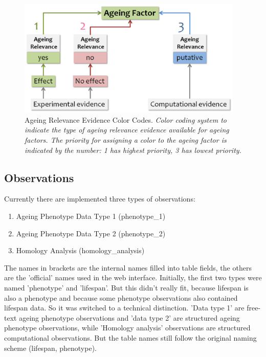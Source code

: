 \documentclass[12pt,a4paper,notitlepage,twoside]{report}
\begin{document}
 \begin{figure}[!ht]
      \includegraphics[width=0.96\textwidth]{data/ageing_relevance_evidence.png}
  \caption[Ageing Relevance Evidence Color Codes]{Ageing Relevance Evidence Color Codes. 
  \newline \textit{Color coding system to indicate the type of ageing relevance evidence available for ageing factors. The priority for assigning a color to the ageing factor is indicated by the number: 1 has highest priority, 3 has lowest priority.}
      \label{fig:ageing_relevance_evidence}
      }
\end{figure}


\subsection{Observations}
Currently there are implemented three types of observations:
\begin{enumerate}[label=\textbf{\arabic*.}]
\item Ageing Phenotype Data Type 1 (phenotype\_1)
\item Ageing Phenotype Data Type 2 (phenotype\_2)
\item Homology Analysis (homology\_analysis)
\end{enumerate}

The names in brackets are the internal names filled into table fields, the others are the 'official' names used in the web interface. Initially, the first two types were named 'phenotype' and 'lifespan'. But this didn't really fit, because lifespan is also a phenotype and because some phenotype observations also contained lifespan data. So it was switched to a technical distinction. 'Data type 1' are free-text ageing phenotype observations and 'data type 2' are structured ageing phenotype observations, while 'Homology analysis' observations are structured computational observations. But the table names still follow the original naming scheme (lifespan, phenotype).
\end{document}
